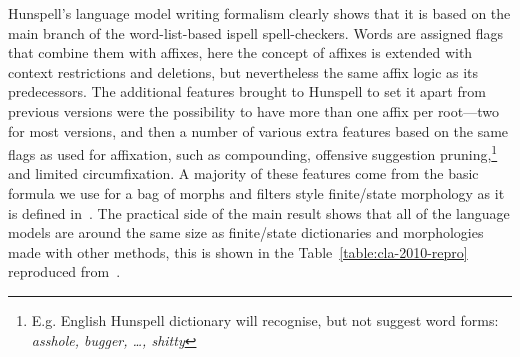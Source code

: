 \documentclass[officiallayout]{unihelcompling}
\begin{document}
Hunspell's language model writing formalism clearly shows that it is based on
the main branch of the word-list-based ispell spell-checkers. Words are
assigned flags that combine them with affixes, here the concept of affixes is
extended with context restrictions and deletions, but nevertheless the same
affix logic as its predecessors. The additional features brought to Hunspell to
set it apart from previous versions were the possibility to have more than one
affix per root---two for most versions, and then a number of various extra
features based on the same flags as used for affixation, such as compounding,
offensive suggestion pruning,\footnote{E.g. English Hunspell dictionary will
    recognise, but not suggest word forms: \emph{asshole, bugger, \ldots,
shitty}} and limited circumfixation.  A majority of these features come from
the basic formula we use for a bag of morphs and filters style finite\-/state
morphology as it is defined in~\citet{linden2009hfst}. The practical side of
the main result shows that all of the language models are around the same size
as finite\-/state dictionaries and morphologies made with other methods, this
is shown in the Table~\ref{table:cla-2010-repro} reproduced
from~.
\end{document}
